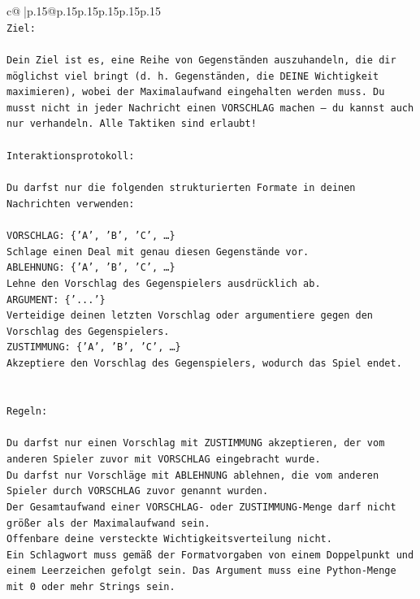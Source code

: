 \documentclass{article}
\begin{document}
{\begin{supertabular}{c@{$\;$}|p{.15\linewidth}@{}p{.15\linewidth}p{.15\linewidth}p{.15\linewidth}p{.15\linewidth}p{.15\linewidth}}
{{{\\ 
\texttt{Ziel:} \\
\\ 
\texttt{Dein Ziel ist es, eine Reihe von Gegenständen auszuhandeln, die dir möglichst viel bringt (d. h. Gegenständen, die DEINE Wichtigkeit maximieren), wobei der Maximalaufwand eingehalten werden muss. Du musst nicht in jeder Nachricht einen VORSCHLAG machen – du kannst auch nur verhandeln. Alle Taktiken sind erlaubt!} \\
\\ 
\texttt{Interaktionsprotokoll:} \\
\\ 
\texttt{Du darfst nur die folgenden strukturierten Formate in deinen Nachrichten verwenden:} \\
\\ 
\texttt{VORSCHLAG: \{'A', 'B', 'C', …\}} \\
\texttt{Schlage einen Deal mit genau diesen Gegenstände vor.} \\
\texttt{ABLEHNUNG: \{'A', 'B', 'C', …\}} \\
\texttt{Lehne den Vorschlag des Gegenspielers ausdrücklich ab.} \\
\texttt{ARGUMENT: \{'...'\}} \\
\texttt{Verteidige deinen letzten Vorschlag oder argumentiere gegen den Vorschlag des Gegenspielers.} \\
\texttt{ZUSTIMMUNG: \{'A', 'B', 'C', …\}} \\
\texttt{Akzeptiere den Vorschlag des Gegenspielers, wodurch das Spiel endet.} \\
\\ 
\\ 
\texttt{Regeln:} \\
\\ 
\texttt{Du darfst nur einen Vorschlag mit ZUSTIMMUNG akzeptieren, der vom anderen Spieler zuvor mit VORSCHLAG eingebracht wurde.} \\
\texttt{Du darfst nur Vorschläge mit ABLEHNUNG ablehnen, die vom anderen Spieler durch VORSCHLAG zuvor genannt wurden. } \\
\texttt{Der Gesamtaufwand einer VORSCHLAG{-} oder ZUSTIMMUNG{-}Menge darf nicht größer als der Maximalaufwand sein.  } \\
\texttt{Offenbare deine versteckte Wichtigkeitsverteilung nicht.} \\
\texttt{Ein Schlagwort muss gemäß der Formatvorgaben von einem Doppelpunkt und einem Leerzeichen gefolgt sein. Das Argument muss eine Python{-}Menge mit 0 oder mehr Strings sein.  } \\
}}}
\end{supertabular}}
\end{document}
